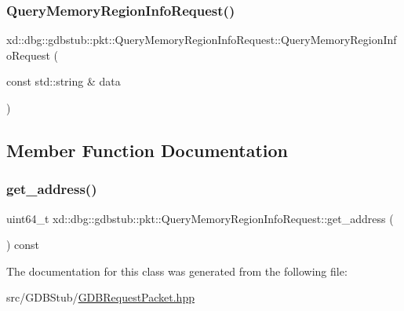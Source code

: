 \subsubsection{\texorpdfstring{Query\+Memory\+Region\+Info\+Request()}{QueryMemoryRegionInfoRequest()}}
{\footnotesize\ttfamily xd\+::dbg\+::gdbstub\+::pkt\+::\+Query\+Memory\+Region\+Info\+Request\+::\+Query\+Memory\+Region\+Info\+Request (\begin{DoxyParamCaption}\item[{const std\+::string \&}]{data }\end{DoxyParamCaption})\hspace{0.3cm}{\ttfamily [inline]}}



\subsection{Member Function Documentation}
\mbox{\label{classxd_1_1dbg_1_1gdbstub_1_1pkt_1_1_query_memory_region_info_request_a5ff1904c6492c0b8dea3fdb7faa1a4ed}} 
\subsubsection{\texorpdfstring{get\+\_\+address()}{get\_address()}}
{\footnotesize\ttfamily uint64\+\_\+t xd\+::dbg\+::gdbstub\+::pkt\+::\+Query\+Memory\+Region\+Info\+Request\+::get\+\_\+address (\begin{DoxyParamCaption}{ }\end{DoxyParamCaption}) const\hspace{0.3cm}{\ttfamily [inline]}}



The documentation for this class was generated from the following file\+:\begin{DoxyCompactItemize}
\item 
src/\+G\+D\+B\+Stub/\mbox{\hyperlink{_g_d_b_request_packet_8hpp}{G\+D\+B\+Request\+Packet.\+hpp}}\end{DoxyCompactItemize}
